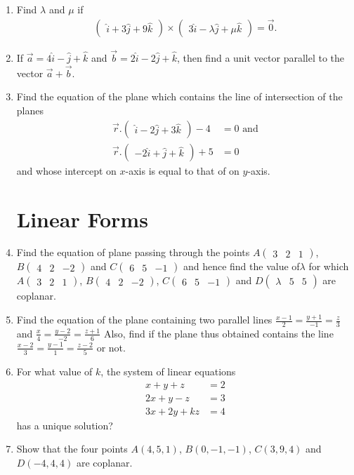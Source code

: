 \documentclass[12pt,-letter paper]{article}
\newcommand{\myvec}[1]{\ensuremath{\begin{pmatrix}#1\end{pmatrix}}}
\begin{document}
\begin{enumerate}
	\item Find $\lambda$ and $\mu$ if
	\begin{align}
		\myvec{\hat{i} + 3\hat{j} + 9\hat{k}} \times \myvec{3\hat{i} - \lambda \hat{j} + \mu \hat{k}} = \overrightarrow{0}.
	\end{align}

	\item If $\overrightarrow{a} = 4\hat{i} - \hat{j} +\hat{k}$ and $\overrightarrow{b} = 2\hat{i} - 2\hat{j} + \hat{k}$, then find a unit vector parallel to the vector $\overrightarrow{a}+\overrightarrow{b}$.

	\item Find the equation of the plane which contains the line of intersection of the planes
	\begin{align}
		\overrightarrow{r}.\myvec{\hat{i} - 2\hat{j} + 3\hat{k}} - 4 &= 0 \text{  and}\\
		\overrightarrow{r}.\myvec{-2\hat{i} + \hat{j} + \hat{k}} + 5 &= 0
	\end{align}
and whose intercept on $x$-axis is equal to that of on $y$-axis.



\section{Linear Forms}
	\item Find the equation of plane passing through the points $A\myvec{3 & 2 & 1}$,
$B\myvec{4 & 2 & -2}$ and $C\myvec{6 & 5 & -1}$ and hence find the value of$\lambda$ for which 
$A\myvec{3 & 2 & 1}$, $B\myvec{4 & 2 & -2}$, $C\myvec{6 & 5 & -1}$ and $D\myvec{\lambda & 5 & 5}$
are coplanar.

	\item Find the equation of the plane containing two parallel lines
$\frac{x-1}{2} = \frac{y+1}{-1} = \frac{z}{3}$ and $\frac{x}{4} = \frac{y-2}{-2} = \frac{z+1}{6}$
Also, find if the plane thus obtained contains the line 
$\frac{x-2}{3} =\frac{y-1}{1} = \frac{z-2}{5}$ or not.



	\item For what value of $k$, the system of linear equations 
	\begin{align}
		x+y+z &= 2\\
		2x+y-z &=3\\
		3x+2y+kz &=4
	\end{align}
	has a unique solution? 
	
	\item Show that the four points $A(4,5,1)$, $ B(0,-1,-1)$, 
$C(3,9,4)$ and $D(-4,4,4)$ are coplanar.


\end{enumerate}
\end{document}
